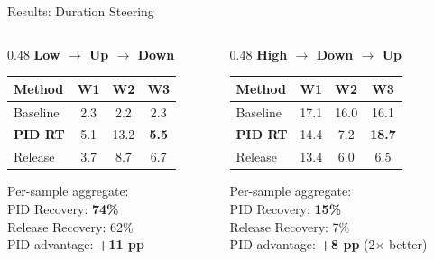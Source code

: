 \documentclass[aspectratio=169]{beamer}
\begin{document}
\begin{frame}{Results: Duration Steering}

\begin{columns}[T]
\begin{column}{0.48\textwidth}
\textbf{Low $\to$ Up $\to$ Down}
\vspace{0.3em}

\begin{small}
\begin{tabular}{lccc}
    \toprule
    Method & W1 & W2 & W3 \\
    \midrule
    \color{basegray}Baseline & 2.3 & 2.2 & 2.3 \\
    \color{pidblue}\textbf{PID RT} & 5.1 & 13.2 & \textbf{5.5} \\
    \color{releasegreen}Release & 3.7 & 8.7 & 6.7 \\
    \bottomrule
\end{tabular}
\end{small}

\vspace{0.5em}
Per-sample aggregate:\\[3pt]
\color{pidblue}PID Recovery: \textbf{74\%}\color{black}\\[2pt]
\color{releasegreen}Release Recovery: 62\%\color{black}\\[2pt]
PID advantage: \textbf{+11 pp}
\end{column}

\begin{column}{0.48\textwidth}
\textbf{High $\to$ Down $\to$ Up}
\vspace{0.3em}

\begin{small}
\begin{tabular}{lccc}
    \toprule
    Method & W1 & W2 & W3 \\
    \midrule
    \color{basegray}Baseline & 17.1 & 16.0 & 16.1 \\
    \color{pidblue}\textbf{PID RT} & 14.4 & 7.2 & \textbf{18.7} \\
    \color{releasegreen}Release & 13.4 & 6.0 & 6.5 \\
    \bottomrule
\end{tabular}
\end{small}

\vspace{0.5em}
Per-sample aggregate:\\[3pt]
\color{pidblue}PID Recovery: \textbf{15\%}\color{black}\\[2pt]
\color{releasegreen}Release Recovery: 7\%\color{black}\\[2pt]
PID advantage: \textbf{+8 pp} (2$\times$ better)
\end{column}
\end{columns}


\end{frame}
\end{document}
